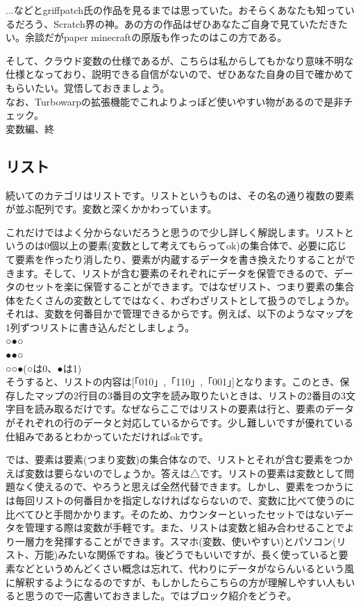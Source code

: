 \documentclass[b5paper,10pt]{jsarticle}
\begin{document}
\begin{multicols*}{3}
...などとgriffpatch氏の作品を見るまでは思っていた。おそらくあなたも知っているだろう、Scratch界の神。あの方の作品はぜひあなたご自身で見ていただきたい。余談だがpaper minecraftの原版も作ったのはこの方である。

そして、クラウド変数の仕様であるが、こちらは私からしてもかなり意味不明な仕様となっており、説明できる自信がないので、ぜひあなた自身の目で確かめてもらいたい。覚悟しておきましょう。\\
なお、Turbowarpの拡張機能でこれよりよっぽど使いやすい物があるので是非チェック。\\
変数編、終

\subsection{リスト}
続いてのカテゴリはリストです。リストというものは、その名の通り複数の要素が並ぶ配列です。変数と深くかかわっています。

これだけではよく分からないだろうと思うので少し詳しく解説します。リストというのは0個以上の要素(変数として考えてもらってok)の集合体で、必要に応じて要素を作ったり消したり、要素が内蔵するデータを書き換えたりすることができます。そして、リストが含む要素のそれぞれにデータを保管できるので、データのセットを楽に保管することができます。ではなぜリスト、つまり要素の集合体をたくさんの変数としてではなく、わざわざリストとして扱うのでしょうか。それは、変数を何番目かで管理できるからです。例えば、以下のようなマップを1列ずつリストに書き込んだとしましょう。\\
○●○\\
●●○\\
○○●(○は0、●は1)\\
そうすると、リストの内容は[「010」,「110」,「001」]となります。このとき、保存したマップの2行目の3番目の文字を読み取りたいときは、リストの2番目の3文字目を読み取るだけです。なぜならここではリストの要素は行と、要素のデータがそれぞれの行のデータと対応しているからです。少し難しいですが優れている仕組みであるとわかっていただければokです。

では、要素は要素(つまり変数)の集合体なので、リストとそれが含む要素をつかえば変数は要らないのでしょうか。答えは△です。リストの要素は変数として問題なく使えるので、やろうと思えば全然代替できます。しかし、要素をつかうには毎回リストの何番目かを指定しなければならないので、変数に比べて使うのに比べてひと手間かかります。そのため、カウンターといったセットではないデータを管理する際は変数が手軽です。また、リストは変数と組み合わせることでより一層力を発揮することができます。スマホ(変数、使いやすい)とパソコン(リスト、万能)みたいな関係ですね。後どうでもいいですが、長く使っていると要素などというめんどくさい概念は忘れて、代わりにデータがならんいるという風に解釈するようになるのですが、もしかしたらこちらの方が理解しやすい人もいると思うので一応書いておきました。ではブロック紹介をどうぞ。


\end{multicols*}
\end{document}
